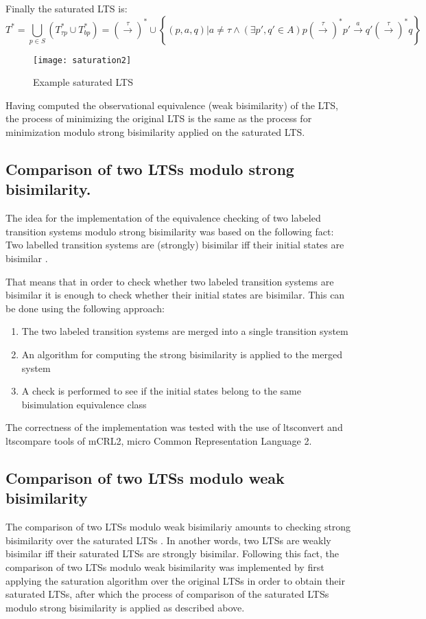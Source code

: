 Finally the saturated LTS is:
\begin{equation*}
	T^{*}=\bigcup_{p\in S}\left(T^{*}_{\tau p}\cup T^{*}_{bp}\right)=\left(\stackrel{\tau}{\rightarrow}\right)^{*}\cup\left\{\left(p,a,q\right)|a\neq\tau\wedge\left(\exists p',q'\in A\right) p\left(\stackrel{\tau}{\rightarrow}\right)^{*}p'\stackrel{a}{\rightarrow}q'\left(\stackrel{\tau}{\rightarrow}\right)^{*}q\right\}
\end{equation*}

\begin{figure}[!ht]
\centering
\texttt{[image: saturation2]}
\caption{Example saturated LTS}
\label{fig:saturation2}
\end{figure}

Having computed the observational equivalence (weak bisimilarity) of the LTS, the process of minimizing the original LTS is the same as the process for minimization modulo strong bisimilarity applied on the saturated LTS.

\subsection{Comparison of two LTSs modulo strong bisimilarity.}
The idea for the implementation of the equivalence checking of two labeled transition systems modulo strong bisimilarity was based on the following fact: Two labelled transition systems are (strongly) bisimilar iff their initial states are bisimilar \cite{ModellingAndAnalysis}.

That means that in order to check whether two labeled transition systems are bisimilar it is enough to check whether their initial states are bisimilar. This can be done using the following approach:
\begin{enumerate}
	\item The two labeled transition systems are merged into a single transition system
	\item An algorithm for computing the strong bisimilarity is applied to the merged system
	\item A check is performed to see if the initial states belong to the same bisimulation equivalence class
\end{enumerate}

The correctness of the implementation was tested with the use of ltsconvert and ltscompare tools of mCRL2, micro Common Representation Language 2.

\subsection{Comparison of two LTSs modulo weak bisimilarity}
The comparison of two LTSs modulo weak bisimilariy amounts to checking strong bisimilarity over the saturated LTSs \cite{ReactiveSystems4}. In another words, two LTSs are weakly bisimilar iff their saturated LTSs are strongly bisimilar. Following this fact, the comparison of two LTSs modulo weak bisimilarity was implemented by first applying the saturation algorithm over the original LTSs in order to obtain their saturated LTSs, after which the process of comparison of the saturated LTSs modulo strong bisimilarity is applied as described above.